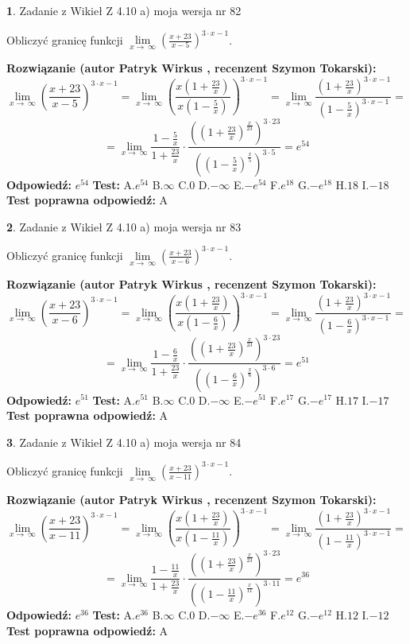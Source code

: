 \documentclass[12pt, a4paper]{article}
\theoremstyle{definition} %
\newtheorem{zad}{}
\newcommand{\zadStart}[1]{\begin{zad}#1\newline}
\newcommand{\zadStop}{\end{zad}}
\newcommand{\rozwStart}[2]{\noindent \textbf{Rozwiązanie (autor #1 , recenzent #2): }\newline}
\newcommand{\rozwStop}{\newline}
\newcommand{\odpStart}{\noindent \textbf{Odpowiedź:}\newline}
\newcommand{\odpStop}{\newline}
\newcommand{\testStart}{\noindent \textbf{Test:}\newline}
\newcommand{\testStop}{\newline}
\newcommand{\kluczStart}{\noindent \textbf{Test poprawna odpowiedź:}\newline}
\newcommand{\kluczStop}{\newline}
\begin{document}
\zadStart{Zadanie z Wikieł Z 4.10 a) moja wersja nr 82}

Obliczyć granicę funkcji  $\lim\limits_{x\to\ \infty}(\frac{x+23}{x-5})^{3\cdot x-1}$.
\zadStop
\rozwStart{Patryk Wirkus}{Szymon Tokarski}
$$\lim\limits_{x\to\ \infty}(\frac{x+23}{x-5})^{3\cdot x-1} = \lim\limits_{x\to\ \infty}(\frac{x(1+\frac{23}{x})}{x(1-\frac{5}{x})})^{3\cdot x-1}=\lim\limits_{x\to\ \infty}\frac{(1+\frac{23}{x})^{3\cdot x-1}}{(1-\frac{5}{x})^{3\cdot x-1}}=$$
$$=\lim\limits_{x\to\ \infty}\frac{1-\frac{5}{x}}{1+\frac{23}{x}}\cdot\frac{((1+\frac{23}{x})^{\frac{x}{23}})^{3\cdot23}}{((1-\frac{5}{x})^{\frac{x}{5}})^{3\cdot5}}=e^{54}$$
\rozwStop
\odpStart
$e^{54}$
\odpStop
\testStart
A.$e^{54}$ B.$\infty$ C.$0$ D.$-\infty$ E.$-e^{54}$
F.$e^{18}$ G.$-e^{18}$
H.$18$
I.$-18$
\testStop
\kluczStart
A
\kluczStop



\zadStart{Zadanie z Wikieł Z 4.10 a) moja wersja nr 83}

Obliczyć granicę funkcji  $\lim\limits_{x\to\ \infty}(\frac{x+23}{x-6})^{3\cdot x-1}$.
\zadStop
\rozwStart{Patryk Wirkus}{Szymon Tokarski}
$$\lim\limits_{x\to\ \infty}(\frac{x+23}{x-6})^{3\cdot x-1} = \lim\limits_{x\to\ \infty}(\frac{x(1+\frac{23}{x})}{x(1-\frac{6}{x})})^{3\cdot x-1}=\lim\limits_{x\to\ \infty}\frac{(1+\frac{23}{x})^{3\cdot x-1}}{(1-\frac{6}{x})^{3\cdot x-1}}=$$
$$=\lim\limits_{x\to\ \infty}\frac{1-\frac{6}{x}}{1+\frac{23}{x}}\cdot\frac{((1+\frac{23}{x})^{\frac{x}{23}})^{3\cdot23}}{((1-\frac{6}{x})^{\frac{x}{6}})^{3\cdot6}}=e^{51}$$
\rozwStop
\odpStart
$e^{51}$
\odpStop
\testStart
A.$e^{51}$ B.$\infty$ C.$0$ D.$-\infty$ E.$-e^{51}$
F.$e^{17}$ G.$-e^{17}$
H.$17$
I.$-17$
\testStop
\kluczStart
A
\kluczStop



\zadStart{Zadanie z Wikieł Z 4.10 a) moja wersja nr 84}

Obliczyć granicę funkcji  $\lim\limits_{x\to\ \infty}(\frac{x+23}{x-11})^{3\cdot x-1}$.
\zadStop
\rozwStart{Patryk Wirkus}{Szymon Tokarski}
$$\lim\limits_{x\to\ \infty}(\frac{x+23}{x-11})^{3\cdot x-1} = \lim\limits_{x\to\ \infty}(\frac{x(1+\frac{23}{x})}{x(1-\frac{11}{x})})^{3\cdot x-1}=\lim\limits_{x\to\ \infty}\frac{(1+\frac{23}{x})^{3\cdot x-1}}{(1-\frac{11}{x})^{3\cdot x-1}}=$$
$$=\lim\limits_{x\to\ \infty}\frac{1-\frac{11}{x}}{1+\frac{23}{x}}\cdot\frac{((1+\frac{23}{x})^{\frac{x}{23}})^{3\cdot23}}{((1-\frac{11}{x})^{\frac{x}{11}})^{3\cdot11}}=e^{36}$$
\rozwStop
\odpStart
$e^{36}$
\odpStop
\testStart
A.$e^{36}$ B.$\infty$ C.$0$ D.$-\infty$ E.$-e^{36}$
F.$e^{12}$ G.$-e^{12}$
H.$12$
I.$-12$
\testStop
\kluczStart
A
\kluczStop
\end{document}
